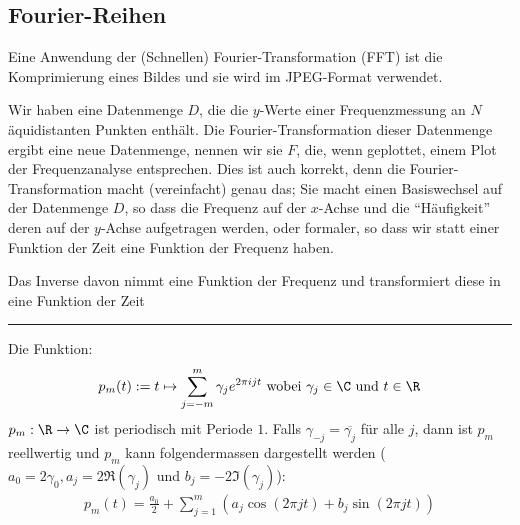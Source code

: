 
%
\subsection{Fourier-Reihen}
Eine Anwendung der (Schnellen) Fourier-Transformation (FFT) ist die Komprimierung eines Bildes und sie wird im JPEG-Format verwendet.

 Wir haben eine Datenmenge $D$, die die $y$-Werte einer Frequenzmessung an $N$ äquidistanten Punkten enthält.
Die Fourier-Transformation dieser Datenmenge ergibt eine neue Datenmenge, nennen wir sie $F$, die, wenn geplottet, einem Plot der Frequenzanalyse entsprechen.
Dies ist auch korrekt, denn die Fourier-Transformation macht (vereinfacht) genau das;
Sie macht einen Basiswechsel auf der Datenmenge $D$, so dass die Frequenz auf der $x$-Achse und die ``Häufigkeit'' deren auf der $y$-Achse aufgetragen werden,
oder formaler, so dass wir statt einer Funktion der Zeit eine Funktion der Frequenz haben.

Das Inverse davon nimmt eine Funktion der Frequenz und transformiert diese in eine Funktion der Zeit

\vspace{0.3cm}
\hrule
\vspace{0.2cm}

 Die Funktion:
\rmvspace
\begin{align*}
    p_m(t) := t \mapsto \sum_{j = -m}^{m} \gamma_j e^{2 \pi ijt} \text{ wobei } \gamma_j \in \C \text{ und } t \in \R
\end{align*}
%
%
\inlineremark $p_m : \R \rightarrow \C$ ist periodisch mit Periode $1$.
Falls $\gamma_{-j} = \overline{\gamma_j}$ für alle $j$, dann ist $p_m$ reellwertig und
$p_m$ kann folgendermassen dargestellt werden ($a_0 = 2\gamma_0, a_j = 2\Re(\gamma_j)$ und $b_j = -2\Im(\gamma_j)$):
\rmvspace
\begin{align*}
    p_m(t) = \frac{a_0}{2} + \sum_{j = 1}^{m} (a_j \cos(2\pi jt) + b_j \sin(2\pi jt))
\end{align*}

